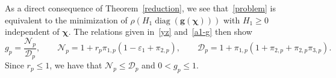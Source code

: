 \documentclass[11pt]{article}
\theoremstyle{plain}
\theoremstyle{remark}
\newtheorem{remark}[theorem]{Remark}
\numberwithin{equation}{section}
\begin{document}

As a direct consequence of Theorem~\ref{reduction}, we see that~\eqref{problem} is
equivalent to the minimization of
$\rho\left(H_1\operatorname{diag}(\bm g(\bm\chi))\right)$ with $H_1\ge 0$ independent of $\bm\chi$. The relations given
in~\eqref{yz} and~\eqref{a1-g} then show
\begin{equation}\label{g-new}
g_p=\frac{\mathcal{N}_p}{\mathcal{D}_p},\qquad
\mathcal{N}_p=1+r_p\pi_{1,p}\left(1-\varepsilon_1+\pi_{2,p}\right),\qquad
\mathcal{D}_p=1+\pi_{1,p}\left(1+\pi_{2,p}+\pi_{2,p}\pi_{3,p}\right).
\end{equation}
Since $r_p\le 1$, we have that $\mathcal{N}_p\le\mathcal{D}_p$ and $0<g_p\le 1$.


\end{document}
